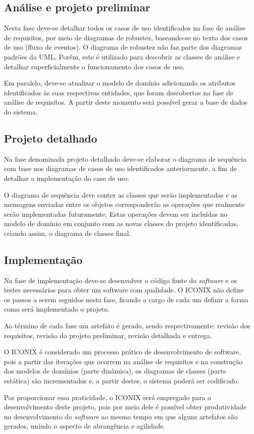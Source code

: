 \subsection{Análise e projeto preliminar}

Nesta fase deve-se detalhar todos os casos de uso identificados na fase de análise de requisitos, por meio de diagramas de robustez, baseando-se no texto dos casos de uso (fluxo de eventos). O diagrama de robustez não faz parte dos diagramas padrões da UML. Porém, este é utilizado para descobrir as classes de análise e detalhar superficialmente o funcionamento dos casos de uso.

Em paralelo, deve-se atualizar o modelo de domínio adicionando os atributos identificados às suas respectivas entidades, que foram descobertas na fase de análise de requisitos. A partir deste momento será possível gerar a base de dados do sistema.


\subsection{Projeto detalhado}

\par Na fase denominada projeto detalhado deve-se elaborar o diagrama de sequência com base nos diagramas de casos de uso identificados anteriormente, a fim de detalhar a implementação do caso de uso.

O diagrama de sequência deve conter as classes que serão implementadas e as mensagens enviadas entre os objetos corresponderão as operações que realmente serão implementadas futuramente. Estas operações devem ser incluídas no modelo de domínio em conjunto com as novas classes do projeto identificadas, criando assim, o diagrama de classes final.

\subsection{Implementação}

Na fase de implementação deve-se desenvolver o código fonte do \textit{software} e os testes necessários para obter um software com qualidade. O ICONIX não define os passos a serem seguidos nesta fase, ficando a cargo de cada um definir a forma como será implementado o projeto.
 
Ao término de cada fase um artefato é gerado, sendo respectivamente: revisão dos requisitos, revisão do projeto preliminar, revisão detalhada e entrega.

O ICONIX é considerado um processo prático de desenvolvimento de software, pois a partir das iterações que ocorrem na análise de requisitos e na construção dos modelos de domínios (parte dinâmica), os diagramas de classes (parte estática) são incrementados e, a partir destes, o sistema poderá ser codificado.


Por proporcionar essa praticidade, o ICONIX será empregado para o desenvolvimento deste projeto, pois por meio dele é possível obter produtividade no desenvolvimento do \textit{software} ao mesmo tempo em que alguns artefatos são gerados, unindo o aspecto de abrangência e agilidade.
